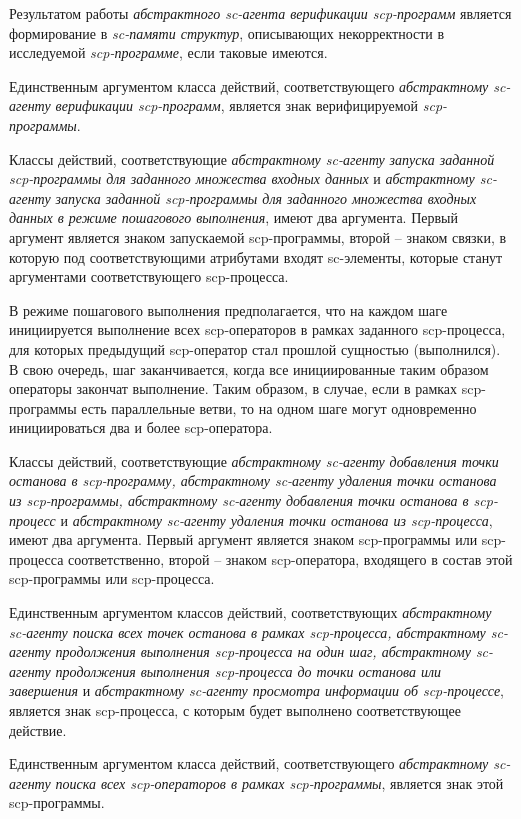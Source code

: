 Результатом работы \textit{абстрактного sc-агента верификации scp-программ} является формирование в \textit{sc-памяти структур}, описывающих некорректности в исследуемой \textit{scp-программе}, если таковые имеются.

Единственным аргументом класса действий, соответствующего \textit{абстрактному sc-агенту верификации scp-программ}, является знак верифицируемой \textit{scp-программы}.

Классы действий, соответствующие \textit{абстрактному sc-агенту запуска заданной scp-программы для заданного множества входных данных} и \textit{абстрактному sc-агенту запуска заданной scp-программы для заданного множества входных данных в режиме пошагового выполнения}, имеют два аргумента. Первый аргумент является знаком запускаемой scp-программы, второй -- знаком связки, в которую под соответствующими атрибутами входят sc-элементы, которые станут аргументами соответствующего scp-процесса.

В режиме пошагового выполнения предполагается, что на каждом шаге инициируется выполнение всех scp-операторов в рамках заданного scp-процесса, для которых предыдущий scp-оператор стал прошлой сущностью (выполнился). В свою очередь, шаг заканчивается, когда все инициированные таким образом операторы закончат выполнение. Таким образом, в случае, если в рамках scp-программы есть параллельные ветви, то на одном шаге могут одновременно инициироваться два и более scp-оператора.

Классы действий, соответствующие \textit{абстрактному sc-агенту добавления точки останова в scp-программу, абстрактному sc-агенту удаления точки останова из scp-программы, абстрактному sc-агенту добавления точки останова в scp-процесс} и \textit{абстрактному sc-агенту удаления точки останова из scp-процесса}, имеют два аргумента. Первый аргумент является знаком scp-программы или scp-процесса соответственно, второй -- знаком scp-оператора, входящего в состав этой scp-программы или scp-процесса.

Единственным аргументом классов действий, соответствующих \textit{абстрактному sc-агенту поиска всех точек останова в рамках scp-процесса, абстрактному sc-агенту продолжения выполнения scp-процесса на один шаг, абстрактному sc-агенту продолжения выполнения scp-процесса до точки останова или завершения} и \textit{абстрактному sc-агенту просмотра информации об scp-процессе}, является знак scp-процесса, с которым будет выполнено соответствующее действие.

Единственным аргументом класса действий, соответствующего \textit{абстрактному sc-агенту поиска всех scp-операторов в рамках scp-программы}, является знак этой scp-программы.

